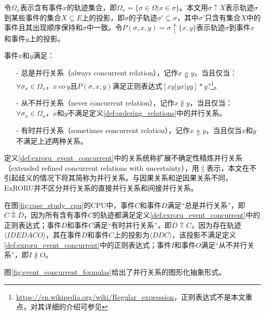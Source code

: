令$\Omega_{x}$表示含有事件$x$的轨迹集合，即$\Omega_{x}=\{\sigma\in\Omega|x\in\sigma\}$。本文用$\sigma\uparrow X$表示轨迹$\sigma$到某些事件的集合$X\subseteq E$上的投影，即$\sigma$的子轨迹$\sigma'\subseteq\sigma$，其中$\sigma'$只含有集合$X$中的事件且其出现顺序保持和$\sigma$中一致。令$P(\sigma,x,y)=\sigma\uparrow\{x,y\}$表示轨迹$\sigma$到事件$x$和事件$y$上的投影。

\begin{definition}[事件间扩展不确定性精炼并行关系]\label{def:exroru_event_concurrent}
事件$x$和$y$满足：
  \begin{itemize}
  	\item[-] 总是并行关系（always concurrent relation），记作$x\Updownarrow y$，当且仅当：$\forall\sigma_{x}\in\Omega_{x}$，$x~co~y$且$P(\sigma,x,y)$满足正则表达式$[xy|yx|yy]*y?$\footnote{\url{https://en.wikipedia.org/wiki/Regular\_expression}，正则表达式不是本文重点，对其详细的介绍可参见}。
  	\item[-] 从不并行关系（never concurrent relation），记作$x\nparallel y$，当且仅当：$\forall\sigma_{x}\in\Omega_{x}$，$x$和$y$不满足定义\ref{def:ordering_relations}中的并行关系。
  	\item[-] 有时并行关系（sometimes concurrent relation），记作$x\Uparrow y$，当且仅当$x$和$y$不满足上述两种关系。
  \end{itemize}
\end{definition}

定义\ref{def:exroru_event_concurrent}中的关系统称扩展不确定性精炼并行关系（extended refined concurrent relations with uncertainty），用$\parallel$表示，本文在不引起歧义的情况下将其简称为并行关系。与因果关系和逆因果关系不同，ExRORU并不区分并行关系的直接并行关系和间接并行关系。

\begin{example}\label{ex:exroru_event_concurrent}
在图\ref{fig:case_study_cpu}的CPU中，事件$C$和事件$D$满足“总是并行关系”，即$C\Updownarrow D$，因为所有含有事件$C$的轨迹都满足定义\ref{def:exroru_event_concurrent}中的正则表达式；事件$D$和事件$C$满足“有时并行关系”，即$D\Uparrow C$，因为存在轨迹$\langle IDEDACO\rangle$，其在事件$D$和事件$C$上的投影为$\langle DDC\rangle$，该投影不满足定义\ref{def:exroru_event_concurrent}中的正则表达式；事件$I$和事件$O$满足“从不并行关系”，即$I\nparallel O$。
\end{example}

图\ref{fig:event_concurrent_formulas}给出了并行关系的图形化抽象形式。

